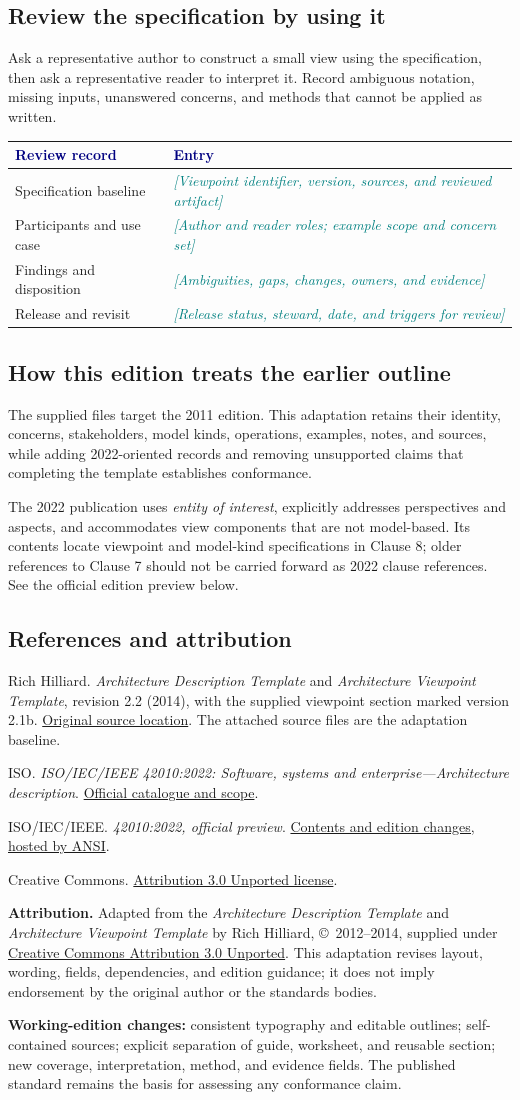 \documentclass[11pt,letterpaper]{article}
\newcommand{\FillIn}[1]{\textcolor{Teal}{\sffamily\itshape[#1]}}
\newcommand{\TableHead}[1]{\textcolor{Navy}{\sffamily\bfseries#1}}
\newcommand{\TemplateAttribution}{%
  \textbf{Attribution.} Adapted from the \emph{Architecture Description Template}
  and \emph{Architecture Viewpoint Template} by Rich Hilliard,
  \copyright\ 2012--2014, supplied under
  \href{https://creativecommons.org/licenses/by/3.0/}{Creative Commons Attribution 3.0 Unported}.
  This adaptation revises layout, wording, fields, dependencies, and edition guidance;
  it does not imply endorsement by the original author or the standards bodies.}
\newcommand{\TemplateSources}{%
  {\small
  \begin{enumerate}[label={[\arabic*]},leftmargin=1.6em,itemsep=6pt]
  \item Rich Hilliard. \emph{Architecture Description Template} and
  \emph{Architecture Viewpoint Template}, revision 2.2 (2014), with the supplied
  viewpoint section marked version 2.1b.
  \href{http://www.iso-architecture.org/42010/templates/}{Original source location}.
  The attached source files are the adaptation baseline.
  \item ISO. \emph{ISO/IEC/IEEE 42010:2022: Software, systems and enterprise---Architecture description}.
  \href{https://www.iso.org/standard/74393.html}{Official catalogue and scope}.
  \item ISO/IEC/IEEE. \emph{42010:2022, official preview}.
  \href{https://webstore.ansi.org/preview-pages/iso/preview_iso\%2Biec\%2Bieee\%2B42010-2022.pdf}{Contents and edition changes, hosted by ANSI}.
  \item Creative Commons. \href{https://creativecommons.org/licenses/by/3.0/}{Attribution 3.0 Unported license}.
  \end{enumerate}}}
\begin{document}
\subsection{Review the specification by using it}
Ask a representative author to construct a small view using the specification,
then ask a representative reader to interpret it. Record ambiguous notation,
missing inputs, unanswered concerns, and methods that cannot be applied as written.

{\small
\begin{tabularx}{\linewidth}{@{}L{1.32in}Y@{}}
\toprule
\TableHead{Review record} & \TableHead{Entry}\\
\midrule
Specification baseline & \FillIn{Viewpoint identifier, version, sources, and reviewed artifact}\\
Participants and use case & \FillIn{Author and reader roles; example scope and concern set}\\
Findings and disposition & \FillIn{Ambiguities, gaps, changes, owners, and evidence}\\
Release and revisit & \FillIn{Release status, steward, date, and triggers for review}\\
\bottomrule
\end{tabularx}}

\subsection{How this edition treats the earlier outline}
The supplied files target the 2011 edition. This adaptation retains their
identity, concerns, stakeholders, model kinds, operations, examples, notes,
and sources, while adding 2022-oriented records and removing unsupported
claims that completing the template establishes conformance.

The 2022 publication uses \emph{entity of interest}, explicitly addresses
perspectives and aspects, and accommodates view components that are not
model-based. Its contents locate viewpoint and model-kind specifications in
Clause 8; older references to Clause 7 should not be carried forward as 2022
clause references. See the official edition preview below.

\subsection{References and attribution}
\TemplateSources
{\footnotesize\color{Muted}\TemplateAttribution\par
\textbf{Working-edition changes:} consistent typography and editable outlines;
self-contained sources; explicit separation of guide, worksheet, and reusable
section; new coverage, interpretation, method, and evidence fields.
The published standard remains the basis for assessing any conformance claim.\par}
\end{document}
